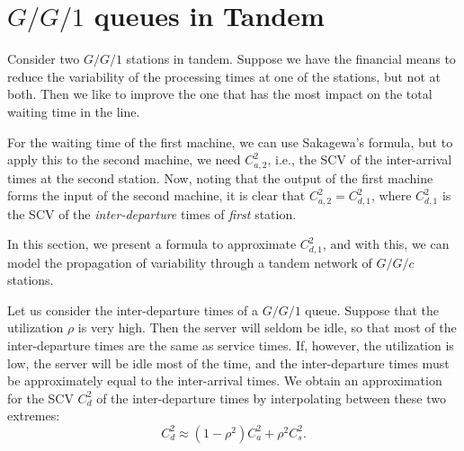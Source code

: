 


\section{$G/G/1$ queues in Tandem}
\label{sec:tandem-queues}


Consider two $G/G/1$ stations in tandem.
Suppose we have the financial means to reduce the variability of the processing times at  one of the stations, but not at both.
Then we like to improve the one that has the most impact on the total waiting time in the line.

For the waiting time of the first machine, we can use Sakagewa's formula, but to apply this to the second machine, we need $C^2_{a,2}$, i.e., the SCV of the inter-arrival times at the second station.
Now, noting that the output of the first machine forms the input of the second machine, it is clear that $C^2_{a,2}=C^2_{d,1}$, where $C^2_{d,1}$ is the SCV of the \emph{inter-departure} times of \emph{first} station.

In this section, we  present a formula
 to approximate $C^2_{d,1}$, and with this, we can model the propagation of variability through a tandem network of $G/G/c$ stations.



Let us consider the inter-departure times of a $G/G/1$ queue.
Suppose that the  utilization $\rho$ is very high.
Then the server will seldom be idle, so that most of the inter-departure times are the same as service times.
If, however, the utilization is low, the server will be idle most of the time, and the inter-departure times must be approximately equal to the inter-arrival times.
We obtain an  approximation for the SCV $C_{d}^2$ of the inter-departure times by  interpolating between these two extremes: 
\begin{equation} \label{eq:40}
 C_{d}^2 \approx  (1-\rho^2) C_{a}^2 + \rho^2 C_{s}^2.
\end{equation}

